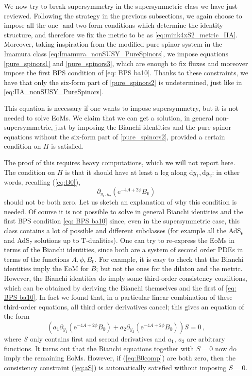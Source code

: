 \documentclass[12pt]{article}
\newcommand{\dd}{\mathrm{d}}
\newcommand{\e}{\mathrm{e}}
\begin{document}
We now try to break supersymmetry in the supersymmetric class we have just reviewed. Following the strategy in the previous subsections, we again choose to impose all the one- and two-form conditions which determine the identity structure, and therefore we fix the metric to be as \eqref{eq:mink4xS2_metric_IIA}. Moreover, taking inspiration from the modified pure spinor system in the Imamura class \eqref{eq:Imamura_nonSUSY_PureSpinors}, we impose equations \eqref{pure_spinors1} and \eqref{pure_spinors3}, which are enough to fix fluxes and moreover impose the first BPS condition of \eqref{eq: BPS ba10}. Thanks to these constraints, we have that only the six-form part of \eqref{pure_spinors2} is undetermined, just like in \eqref{eq:IIA_nonSUSY_PureSpinors}.


This equation is necessary if one wants to impose supersymmetry, but it is not needed to solve EoMs. 
We claim that we can get a solution, in general non-supersymmetric, just by imposing the Bianchi identities and the pure spinor equations without the six-form part of \eqref{pure_spinors2}, provided a certain condition on $H$ is satisfied.

The proof of this requires heavy computations, which we will not report here. The  condition on $H$ is that it should have at least a leg along $\dd y_1 , \dd y_2$: in other words, recalling (\ref{eq:B0}), 
\begin{equation}\label{eq:B0comp}
	\partial_{y_1,y_2} (\e^{-4A+2\phi}B_0)
\end{equation}
should not be both zero.  Let us sketch an explanation of why this condition is needed. Of course it is not possible to solve in general Bianchi identities and the first BPS condition \eqref{eq: BPS ba10} since, even in the supersymmetric case, this class contains a lot of possible and different subclasses (for example all the AdS$_6$ and AdS$_7$ solutions up to T-dualities). One can try to re-express the EoMs in terms of the Bianchi identities, since both are a system of second order PDEs in terms of the functions $A,\phi,B_0$. For example, it is easy to check that the Bianchi identities imply the EoM for $B$; but not the ones for the dilaton and the metric. However, the Bianchi identities do imply some third-order consistency conditions, which can be obtained by deriving the Bianchi themselves and the first of \eqref{eq: BPS ba10}. In fact we found that, in a particular linear combination of these third-order equations, all third order derivatives cancel; this gives an equation of the form 
\begin{equation}\label{eq:aS}
	   (a_1\partial_{y_1} (\e^{-4A+2\phi}B_0)+a_2\partial_{y_2} (\e^{-4A+2\phi}B_0)) S =0\,,
\end{equation}
where $S$ only contains first and second derivatives and $a_1$, $a_2$ are arbitrary functions. It turns out that the Bianchi equations together with $S=0$ now do imply the remaining EoMs. However, if (\ref{eq:B0comp}) are both zero, then the consistency constraint (\ref{eq:aS}) is automatically satisfied without imposing $S=0$.       
\end{document}
